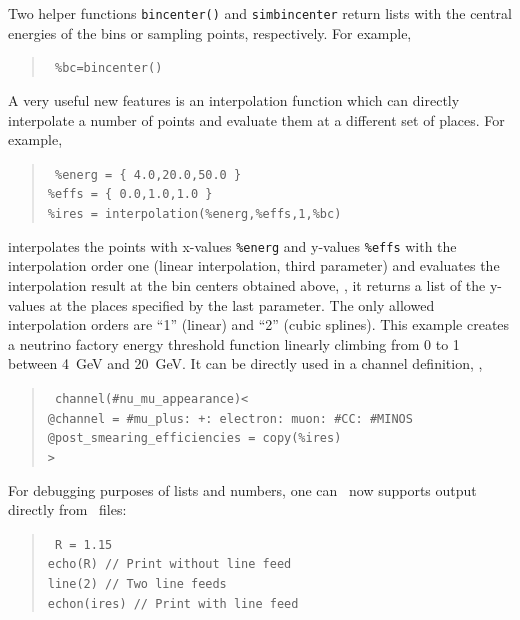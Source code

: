 Two helper functions {\tt bincenter()} 
 and {\tt simbincenter}  return lists with the central energies of the bins or sampling points, respectively. For example,
\begin{quote}
{\tt
 \%bc=bincenter() 
}
\end{quote}
A very useful new features is an interpolation function which can directly interpolate a number of
points and evaluate them at a different set of places. For example,
\begin{quote}
{\tt
 \%energ = \{ 4.0,20.0,50.0 \} \\
 \%effs = \{ 0.0,1.0,1.0 \} \\
 \%ires = interpolation(\%energ,\%effs,1,\%bc) 
}
\end{quote}
interpolates the points with x-values {\tt \%energ} and y-values {\tt \%effs} with the interpolation order one (linear interpolation, third parameter) and evaluates the interpolation result at the bin centers obtained above, \ie, it returns a list of the y-values at the places specified by the last parameter. The only allowed interpolation orders are ``1'' (linear) and ``2'' (cubic splines). This example creates
a neutrino factory energy threshold function linearly climbing from 0 to 1 between 4~GeV and 20~GeV. It can be directly used in a channel definition, \eg, 
\begin{quote}
{\tt
 channel(\#nu\_mu\_appearance)< \\
\hspace*{0.5cm}	@channel = \#mu\_plus: +: electron: muon: \#CC: \#MINOS\ \\
\hspace*{0.5cm}	@post\_smearing\_efficiencies = copy(\%ires) \\
>
}
\end{quote}


For debugging purposes of lists and numbers, one can \GLOBES\ now supports output directly
from \AEDL\ files:
\begin{quote}
{\tt 
 R = 1.15 \\
 echo(R) // Print without line feed \\
 line(2) // Two line feeds \\
 echon(ires) // Print with line feed 
}
\end{quote}



